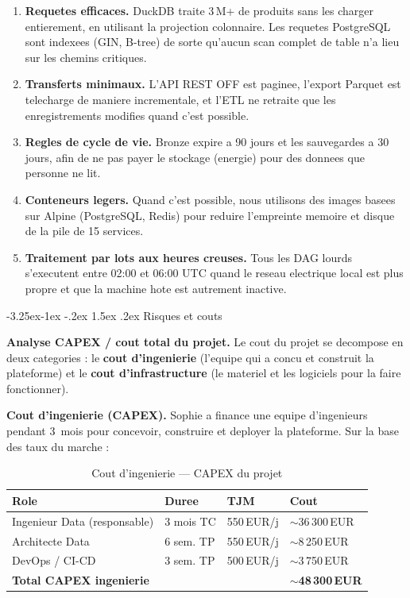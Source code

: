 \documentclass[a4paper,11pt,oneside,openany]{report}
\makeatletter
\renewcommand\subsubsection{\@startsection{subsubsection}{3}{\z@}%
  {-3.25ex\@plus -1ex \@minus -.2ex}%
  {1.5ex \@plus .2ex}%
  {\normalfont\normalsize\bfseries\color{ntblue}}}
\makeatother
\begin{document}
\begin{enumerate}[nosep]
  \item \textbf{Requetes efficaces.} DuckDB traite 3\,M+ de produits
        sans les charger entierement, en utilisant la projection
        colonnaire. Les requetes PostgreSQL sont indexees (GIN,
        B-tree) de sorte qu'aucun scan complet de table n'a lieu
        sur les chemins critiques.
  \item \textbf{Transferts minimaux.} L'API REST OFF est paginee,
        l'export Parquet est telecharge de maniere incrementale, et
        l'ETL ne retraite que les enregistrements modifies quand
        c'est possible.
  \item \textbf{Regles de cycle de vie.} Bronze expire a 90 jours et
        les sauvegardes a 30 jours, afin de ne pas payer le stockage
        (energie) pour des donnees que personne ne lit.
  \item \textbf{Conteneurs legers.} Quand c'est possible, nous
        utilisons des images basees sur Alpine (PostgreSQL, Redis)
        pour reduire l'empreinte memoire et disque de la pile de
        15 services.
  \item \textbf{Traitement par lots aux heures creuses.} Tous les
        DAG lourds s'executent entre 02:00 et 06:00 UTC quand le
        reseau electrique local est plus propre et que la machine
        hote est autrement inactive.
\end{enumerate}

\subsubsection{Risques et couts}
\label{sec:capex}

\textbf{Analyse CAPEX / cout total du projet.} Le cout du projet
se decompose en deux categories : le \textbf{cout d'ingenierie}
(l'equipe qui a concu et construit la plateforme) et le
\textbf{cout d'infrastructure} (le materiel et les logiciels pour
la faire fonctionner).

\textbf{Cout d'ingenierie (CAPEX).} Sophie a finance une equipe
d'ingenieurs pendant 3~mois pour concevoir, construire et deployer
la plateforme. Sur la base des taux du marche :

\begin{table}[H]
\centering
\caption{Cout d'ingenierie --- CAPEX du projet}
\begin{tabularx}{\textwidth}{L{5cm} C{2cm} C{2cm} C{3cm}}
\toprule
\textbf{Role} & \textbf{Duree} & \textbf{TJM} & \textbf{Cout} \\
\midrule
Ingenieur Data (responsable) & 3 mois TC & 550\,EUR/j & $\sim$36\,300\,EUR \\
Architecte Data & 6 sem. TP & 550\,EUR/j & $\sim$8\,250\,EUR \\
DevOps / CI-CD & 3 sem. TP & 500\,EUR/j & $\sim$3\,750\,EUR \\
\midrule
\textbf{Total CAPEX ingenierie} & & & \textbf{$\sim$48\,300\,EUR} \\
\bottomrule
\end{tabularx}
\end{table}
\end{document}
